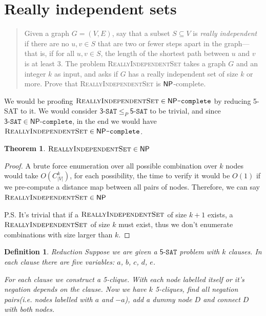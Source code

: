 
\newtheorem{theorem}{Theorem}
\newtheorem{lemma}[theorem]{Lemma}
\newtheorem{definition}{Definition}[section]


\maketitle
\thispagestyle{firststyle}
\vspace{-2.0cm}

\newcommand{\RIS}{\textsc{ReallyIndependentSet}}
\newcommand{\NPC}{\mathsf{NP}\texttt{-complete}}
\newcommand{\fSAT}{\mathsf{5}\texttt{-SAT}}
\newcommand{\tSAT}{\mathsf{3}\texttt{-SAT}}

\section{Really independent sets}
    \begin{quote}
    Given a graph $G = (V,E)$, say that a subset $S \subseteq V$ is \emph{really independent} if there are no $u,v \in S$ that are two or fewer steps apart in the graph---that is, if for all $u,v \in S$, the length of the shortest path
    between $u$ and $v$ is at least 3.
    The problem \textsc{ReallyIndependentSet} takes a graph $G$ and an integer $k$ as input, and asks if $G$ has a really independent set of size $k$ or more.
    Prove that \textsc{ReallyIndependentSet} is $\mathsf{NP}$-complete.
    \end{quote}

We would be proofing $\RIS \in \NPC$ by reducing 5-SAT to it. 
We would consider $\tSAT \le_P \fSAT$ to be trivial, and since $\tSAT \in \NPC$, in the end we would have $\RIS \in \NPC$.

\begin{theorem}
    $\RIS \in \NP $
\end{theorem}

\begin{proof}
    A brute force enumeration over all possible combination over $k$ nodes would take $O(C^k_{|V|})$, for each possibility, the time to verify it would be $O(1)$ if we pre-compute a distance map between all pairs of nodes.
    Therefore, we can say $\RIS \in \NP$
    
    P.S. It's trivial that if a $\RIS$ of size $k+1$ exists, a $\RIS$ of size $k$ must exist, thus we don't enumerate combinations with size larger than $k$.
\end{proof}

\theoremstyle{definition}
\begin{definition}{Reduction}
    Suppose we are given a $\fSAT$ problem with $k$ clauses. In each clause there are five variables: $a$, $b$, $c$, $d$, $e$.

    For each clause we construct a 5-clique. With each node labelled itself or it's negation depends on the clause.
    Now we have $k$ 5-cliques, find all negation pairs(i.e. nodes labelled with $a$ and $-a$), add a dummy node $D$ and connect $D$ with both nodes.
\end{definition}

